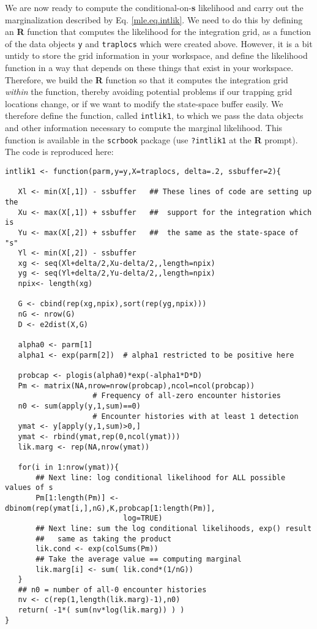 We are now ready to  compute the conditional-on-{\bf s} likelihood and
carry out the marginalization described by Eq. \ref{mle.eq.intlik}.
We need to do this by defining an {\bf R} function that computes the
likelihood for the integration grid, as a function of the data objects \mbox{\tt y} and
\mbox{\tt traplocs} which were created above. However,
it is a bit untidy to store the grid information in your workspace,
and define the likelihood function in a way that depends on these things that
exist in your workspace.  Therefore, we build the {\bf R} function so
that it computes the integration grid {\it within} the function, thereby
avoiding potential problems if our trapping grid locations change, or
if we want to modify the state-space buffer easily.  We therefore
define the function, called \mbox{\tt intlik1}, to which we pass the data
objects and other information necessary to compute the marginal
likelihood.  This function is available in the \mbox{\tt scrbook}
package (use {\tt ?intlik1} at the {\bf R} prompt).  The code is
reproduced here:

{\small 
\begin{verbatim}
intlik1 <- function(parm,y=y,X=traplocs, delta=.2, ssbuffer=2){

   Xl <- min(X[,1]) - ssbuffer   ## These lines of code are setting up the 
   Xu <- max(X[,1]) + ssbuffer   ##  support for the integration which is
   Yu <- max(X[,2]) + ssbuffer   ##  the same as the state-space of "s"
   Yl <- min(X[,2]) - ssbuffer
   xg <- seq(Xl+delta/2,Xu-delta/2,,length=npix) 
   yg <- seq(Yl+delta/2,Yu-delta/2,,length=npix) 
   npix<- length(xg)

   G <- cbind(rep(xg,npix),sort(rep(yg,npix)))
   nG <- nrow(G)
   D <- e2dist(X,G)  

   alpha0 <- parm[1]
   alpha1 <- exp(parm[2])  # alpha1 restricted to be positive here
                      
   probcap <- plogis(alpha0)*exp(-alpha1*D*D)
   Pm <- matrix(NA,nrow=nrow(probcap),ncol=ncol(probcap))
                    # Frequency of all-zero encounter histories
   n0 <- sum(apply(y,1,sum)==0) 
                    # Encounter histories with at least 1 detection
   ymat <- y[apply(y,1,sum)>0,] 
   ymat <- rbind(ymat,rep(0,ncol(ymat)))
   lik.marg <- rep(NA,nrow(ymat))
   
   for(i in 1:nrow(ymat)){
       ## Next line: log conditional likelihood for ALL possible values of s
       Pm[1:length(Pm)] <- dbinom(rep(ymat[i,],nG),K,probcap[1:length(Pm)],
                           log=TRUE)
       ## Next line: sum the log conditional likelihoods, exp() result
       ##   same as taking the product
       lik.cond <- exp(colSums(Pm))
       ## Take the average value == computing marginal
       lik.marg[i] <- sum( lik.cond*(1/nG))  
   }
   ## n0 = number of all-0 encounter histories
   nv <- c(rep(1,length(lik.marg)-1),n0)
   return( -1*( sum(nv*log(lik.marg)) ) )
}
\end{verbatim}
}

